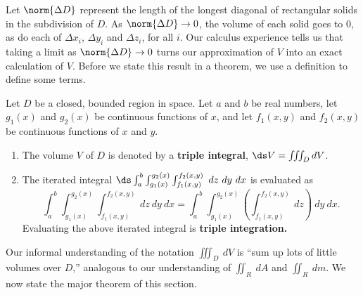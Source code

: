 Let $\norm{\Delta D}$ represent the length of the longest diagonal of rectangular solids in the subdivision of $D$. As $\norm{\Delta D}\to 0$, the volume of each solid goes to 0, as do each of $\Delta x_i$, $\Delta y_i$ and $\Delta z_i$, for all $i$. Our calculus experience tells us that taking a limit as $\norm{\Delta D}\to 0$ turns our approximation of $V$ into an exact calculation of $V$. Before we state this result in a theorem, we use a definition to define some terms.

\setboxwidth{90pt}
{Let $D$ be a closed, bounded region in space. Let $a$ and $b$ be real numbers, let $g_1(x)$ and $g_2(x)$ be continuous functions of $x$, and let $f_1(x,y)$ and $f_2(x,y)$ be continuous functions of $x$ and $y$.
\begin{enumerate}
	\item	The volume $V$ of $D$ is denoted by a \textbf{triple integral},
	$\ds V = \iiint_D dV$.
	
	\item The iterated integral $\ds \int_a^b\int_{g_1(x)}^{g_2(x)}\int_{f_1(x,y)}^{f_2(x,y)} \ dz\ dy\ dx$ is evaluated as 
	\[\int_a^b\int_{g_1(x)}^{g_2(x)}\int_{f_1(x,y)}^{f_2(x,y)} \ dz\ dy\ dx=\int_a^b\int_{g_1(x)}^{g_2(x)}\left(\int_{f_1(x,y)}^{f_2(x,y)} \ dz\right)\ dy\ dx.\]
	Evaluating the above iterated integral is \textbf{triple integration.}
\end{enumerate}}

Our informal understanding of the notation $\iiint_D\ dV$ is ``sum up lots of little volumes over $D$,'' analogous to our understanding of $\iint_R\ dA$ and $\iint_R\ dm$. We now state the major theorem of this section.

